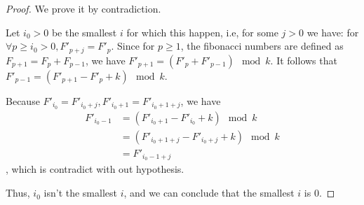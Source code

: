 \documentclass[UTF8, a4paper, linespread=1.5]{article}
\begin{document}
\begin{proof}
    We prove it by contradiction.
    
    Let $i_0 > 0$ be the smallest $i$ for which this happen, i.e, for some $j > 0$ we have: for $\forall p \geqslant i_0 > 0, F'_{p + j} = F'_p$. Since for $p \geqslant 1$, the fibonacci numbers are defined as $F_{p + 1} = F_{p} + F_{p - 1}$, we have $F'_{p + 1} = (F'_p + F'_{p - 1}) \mod k$. It follows that $F'_{p - 1} = (F'_{p + 1} - F'_p + k) \mod k$.
    
    Because $F'_{i_0} = F'_{i_0 + j}, F'_{i_0 + 1} = F'_{i_0 + 1 + j}$, we have
    \begin{align*}
        F'_{i_0 - 1} &= (F'_{i_0 + 1} - F'_{i_0} + k) \mod k \\
        &= (F'_{i_0 + 1 + j} - F'_{i_0 + j} + k) \mod k \\
        &= F'_{i_0 - 1 + j}
    \end{align*}
    , which is contradict with out hypothesis.
    
    Thus, $i_0$ isn't the smallest $i$, and we can conclude that the smallest $i$ is $0$.
\end{proof}
\end{document}
